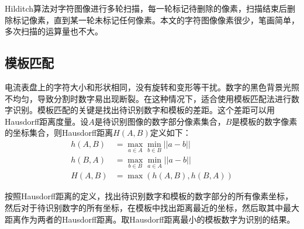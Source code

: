 Hilditch算法对字符图像进行多轮扫描，每一轮标记待删除的像素，扫描结束后删除标记像素，直到某一轮未标记任何像素。本文的字符图像像素很少，笔画简单，多次扫描的运算量也不大。

\subsection{模板匹配}

电流表盘上的字符大小和形状相同，没有旋转和变形等干扰。数字的黑色背景光照不均匀，导致分割时数字易出现断裂。在这种情况下，适合使用模板匹配法进行数字识别。模板匹配的关键是找出待识别数字和模板的差距。这个差距可以用Hausdorff距离度量。设$A$是待识别图像的数字部分像素集合，$B$是模板的数字像素的坐标集合，则Hausdorff距离$H(A,B)$定义如下：
\begin{equation}
  \begin{aligned}
    h(A,B)&=\max_{a\in A}\min_{b\in B}||a-b||\\
    h(B,A)&=\max_{b\in B}\min_{a\in A}||a-b||\\
    H(A,B)&=\max(h(A,B),h(B,A))
  \end{aligned}
\end{equation}

按照Hausdorff距离的定义，找出待识别数字和模板的数字部分的所有像素坐标，然后对于待识别数字的所有坐标，在模板中找出距离最近的坐标，然后取其中最大距离作为两者的Hausdorff距离。取Hausdorff距离最小的模板数字为识别的结果。


